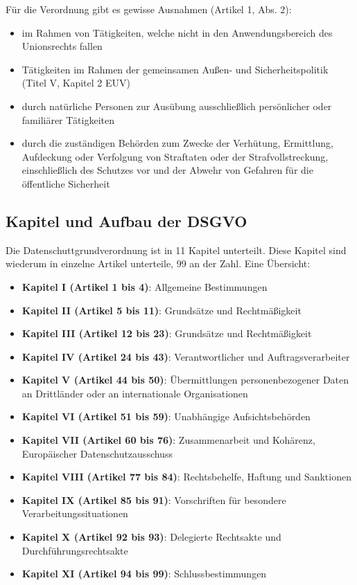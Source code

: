 Für die Verordnung gibt es gewisse Ausnahmen (Artikel 1, Abs. 2):
\begin{itemize}
	\item im Rahmen von Tätigkeiten, welche nicht in den Anwendungsbereich des Unionsrechts fallen
	\item Tätigkeiten im Rahmen der gemeinsamen Außen- und Sicherheitspolitik (Titel V, Kapitel 2 EUV)
	\item durch natürliche Personen zur Ausübung ausschließlich persönlicher oder familiärer Tätigkeiten
	\item durch die zuständigen Behörden zum Zwecke der Verhütung, Ermittlung, Aufdeckung oder Verfolgung von Straftaten oder der Strafvollstreckung, einschließlich des Schutzes vor und der Abwehr von Gefahren für die öffentliche Sicherheit
\end{itemize}



\subsection{Kapitel und Aufbau der DSGVO}
Die Datenschuttgrundverordnung ist in 11 Kapitel unterteilt. Diese Kapitel sind wiederum in einzelne Artikel unterteile, 99 an der Zahl. Eine Übersicht:

\begin{itemize}
	\item \textbf{Kapitel I (Artikel 1 bis 4)}: Allgemeine Bestimmungen
	\item \textbf{Kapitel II (Artikel 5 bis 11)}: Grundsätze und Rechtmäßigkeit
	\item \textbf{Kapitel III (Artikel 12 bis 23)}: Grundsätze und Rechtmäßigkeit
	\item \textbf{Kapitel IV (Artikel 24 bis 43)}: Verantwortlicher und Auftragsverarbeiter
	\item \textbf{Kapitel V (Artikel 44 bis 50)}: Übermittlungen personenbezogener Daten an Drittländer oder an internationale Organisationen
	\item \textbf{Kapitel VI (Artikel 51 bis 59)}: Unabhängige Aufsichtsbehörden
	\item \textbf{Kapitel VII (Artikel 60 bis 76)}: Zusammenarbeit und Kohärenz, Europäischer Datenschutzausschuss
	\item \textbf{Kapitel VIII (Artikel 77 bis 84)}: Rechtsbehelfe, Haftung und Sanktionen
	\item \textbf{Kapitel IX (Artikel 85 bis 91)}: Vorschriften für besondere Verarbeitungssituationen
	\item \textbf{Kapitel X (Artikel 92 bis 93)}: Delegierte Rechtsakte und Durchführungsrechtsakte
	\item \textbf{Kapitel XI (Artikel 94 bis 99)}: Schlussbestimmungen
\end{itemize}

